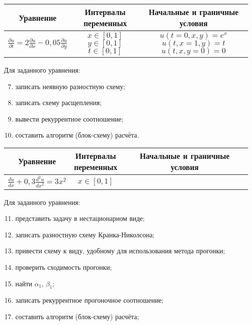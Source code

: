 \documentclass[12pt, a4paper]{report}
\begin{document}
	\begin{center}
		\begin{tabular}{||c|c|c||}
			\hline
			Уравнение & \makecell{Интервалы \\ переменных} & Начальные и граничные условия \\

			\hline
			$ \frac{\partial u}{\partial t} = 2\frac{\partial u}{\partial x} - 0,05\frac{\partial u}{\partial y} $ & \makecell{$ x \in [0, 1] $ \\ $ y \in [0, 1] $ \\ $ t \in [0, 1] $} & \makecell{$ u(t = 0, x, y) = e^{x} $ \\ $ u(t, x = 1, y) = t $ \\ $ u(t, x, y = 0) = 0 $} \\

			\hline
		\end{tabular}
	\end{center}
	\par
	Для заданного уравнения:
	\begin{enumerate}
		\setcounter{enumi}{6}
		\item записать неявную разностную схему;
		\item записать схему расщепления;
		\item вывести рекуррентное соотношение;
		\item составить алгоритм (блок-схему) расчёта.
	\end{enumerate}
	
	\begin{center}
		\begin{tabular}{||c|c|c||}
			\hline
			Уравнение & \makecell{Интервалы \\ переменных} & Начальные и граничные условия \\

			\hline
			\small 
			$ \frac{du}{dx} + 0,3\frac{d^{2} u}{dx^{2}} = 3x^{2} $ & $ x \in [0, 1] $ & \makecell{$\begin{cases} \frac{du}{dx}(x = 0) = 0 \\ \frac{du}{dx}(x = 1) = 1 \end{cases}$} \\

			\hline
		\end{tabular}
	\end{center}
	\par
	Для заданного уравнения:
	\begin{enumerate}
		\setcounter{enumi}{10}
		\item представить задачу в нестационарном виде;
		\item записать разностную схему Кранка-Николсона;
		\item привести схему к виду, удобному для использования метода прогонки;
		\item проверить сходимость прогонки;
		\item найти $\alpha_1$, $\beta_1$;
		\item записать рекуррентное прогоночное соотношение;
		\item составить алгоритм (блок-схему) расчёта;
	\end{enumerate}
\end{document}
